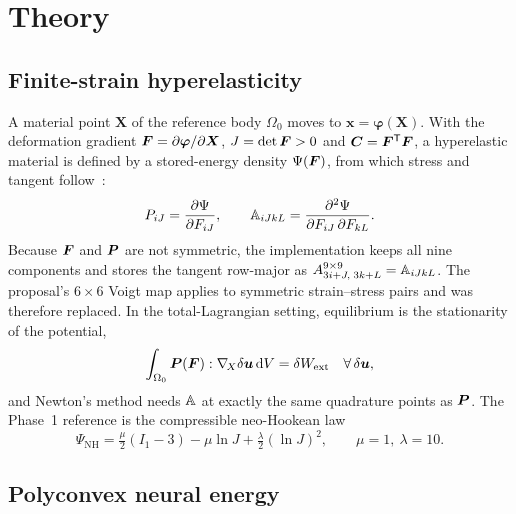 \chapter{Theory}\label{ch:theory}

\section{Finite-strain hyperelasticity}

A material point $\bm X$ of the reference body $\Omega_0$ moves to
$\bm x=\bm\varphi(\bm X)$. With the deformation gradient
$\bm F=\partial\bm\varphi/\partial\bm X$, $J=\det\bm F>0$ and $\bm C=\bm F^{\mathsf T}\bm F$,
a hyperelastic material is defined by a stored-energy density $\Psi(\bm F)$, from
which stress and tangent follow~\cite{Holzapfel2000}:
\begin{equation}
  P_{iJ}=\frac{\partial\Psi}{\partial F_{iJ}},\qquad
  \mathbb A_{iJkL}=\frac{\partial^2\Psi}{\partial F_{iJ}\,\partial F_{kL}}.
  \label{eq:PA}
\end{equation}
Because $\bm F$ and $\bm P$ are not symmetric, the implementation keeps all nine
components and stores the tangent row-major as
$A^{9\times9}_{3i+J,\;3k+L}=\mathbb A_{iJkL}$. The proposal's $6\times6$ Voigt map
applies to symmetric strain--stress pairs and was therefore replaced. In the
total-Lagrangian setting, equilibrium is the stationarity of the potential,
\begin{equation}
  \int_{\Omega_0}\bm P(\bm F):\nabla_{\!X}\delta\bm u\,\mathrm d V=\delta W_{\mathrm{ext}}
  \quad\forall\,\delta\bm u,
  \label{eq:weak}
\end{equation}
and Newton's method needs $\mathbb A$ at exactly the same quadrature points as
$\bm P$. The Phase~1 reference is the compressible neo-Hookean law
\begin{equation}
  \Psi_{\mathrm{NH}}=\tfrac{\mu}{2}(I_1-3)-\mu\ln J+\tfrac{\lambda}{2}(\ln J)^2,
  \qquad \mu=1,\ \lambda=10.
  \label{eq:nh}
\end{equation}

\section{Polyconvex neural energy}

